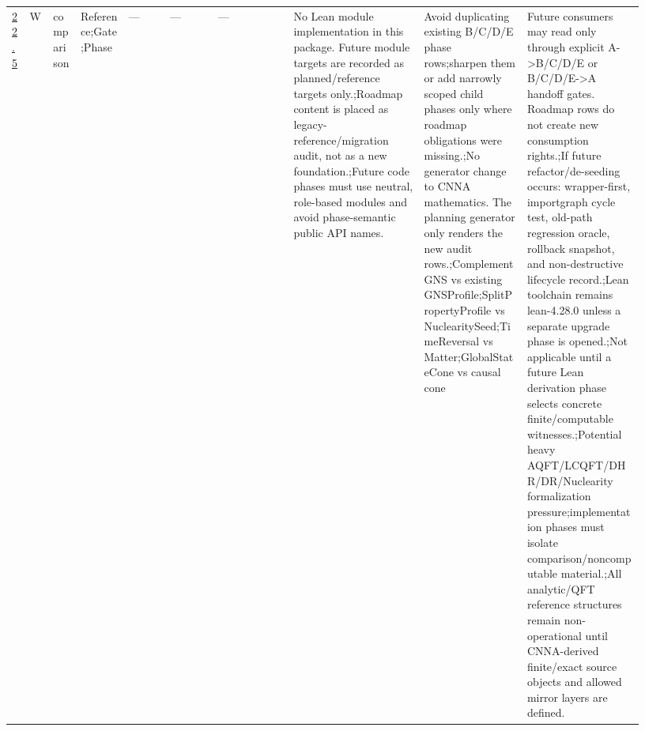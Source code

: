 \begin{longtable}{L{0.026\linewidth} L{0.024\linewidth} L{0.045\linewidth} L{0.07\linewidth} L{0.065\linewidth} L{0.075\linewidth} L{0.11\linewidth} L{0.19\linewidth} L{0.155\linewidth} L{0.17\linewidth}}
\hline
\addlinespace[0.24em]
\hyperlink{phase-row-22-5}{22.5} & W & comparison & Reference;\newline Gate;\newline Phase & --- & --- & --- & No Lean module implementation in this package. Future module targets are recorded as planned/\allowbreak{}reference targets only.;\newline Roadmap content is placed as legacy-reference/\allowbreak{}migration audit, not as a new foundation.;\newline Future code phases must use neutral, role-based modules and avoid phase-semantic public API names. & Avoid duplicating existing B/\allowbreak{}C/\allowbreak{}D/\allowbreak{}E phase rows;\newline sharpen them or add narrowly scoped child phases only where roadmap obligations were missing.;\newline No generator change to CNNA mathematics. The planning generator only renders the new audit rows.;\newline ComplementGNS vs existing GNSProfile;\newline SplitPropertyProfile vs NuclearitySeed;\newline TimeReversal vs Matter;\newline GlobalStateCone vs causal cone & Future consumers may read only through explicit A->B/\allowbreak{}C/\allowbreak{}D/\allowbreak{}E or B/\allowbreak{}C/\allowbreak{}D/\allowbreak{}E->A handoff gates. Roadmap rows do not create new consumption rights.;\newline If future refactor/\allowbreak{}de-seeding occurs: wrapper-first, importgraph cycle test, old-path regression oracle, rollback snapshot, and non-destructive lifecycle record.;\newline Lean toolchain remains lean-4.28.0 unless a separate upgrade phase is opened.;\newline Not applicable until a future Lean derivation phase selects concrete finite/\allowbreak{}computable witnesses.;\newline Potential heavy AQFT/\allowbreak{}LCQFT/\allowbreak{}DHR/\allowbreak{}DR/\allowbreak{}Nuclearity formalization pressure;\newline implementation phases must isolate comparison/\allowbreak{}noncomputable material.;\newline All analytic/\allowbreak{}QFT reference structures remain non-operational until CNNA-derived finite/\allowbreak{}exact source objects and allowed mirror layers are defined.\\

\end{longtable}
